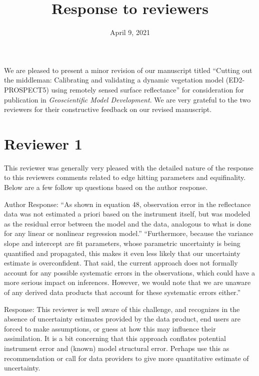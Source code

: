 \documentclass{article}
\title{Response to reviewers}
\author{}
\date{April 9, 2021}
\newenvironment{reviewer}{\par\color{Mahogany}\vspace{6pt}}{\par\vspace{6pt}}
\begin{document}
\maketitle

We are pleased to present a minor revision of our manuscript titled ``Cutting out the middleman: Calibrating and validating a dynamic vegetation model (ED2-PROSPECT5) using remotely sensed surface reflectance'' for consideration for publication in \emph{Geoscientific Model Development}.
We are very grateful to the two reviewers for their constructive feedback on our revised manuscript.

\section{Reviewer 1}\label{sec:r1}

\begin{reviewer}
  This reviewer was generally very pleased with the detailed nature of the response to this reviewers comments related to edge hitting parameters and equifinality. Below are a few follow up questions based on the author response.

  Author Response:
  ``As shown in equation 48, observation error in the reflectance data was not estimated a priori based on the instrument itself, but was modeled as the residual error between the model and the data, analogous to what is done for any linear or nonlinear regression model.''
  ``Furthermore, because the variance slope and intercept are fit parameters, whose parametric uncertainty is being quantified and propagated, this makes it even less likely that our uncertainty estimate is overconfident. That said, the current approach does not formally account for any possible systematic errors in the observations, which could have a more serious impact on inferences. However, we would note that we are unaware of any derived data products that account for these systematic errors either.''

  Response: This reviewer is well aware of this challenge, and recognizes in the absence of uncertainty estimates provided by the data product, end users are forced to make assumptions, or guess at how this may influence their assimilation. It is a bit concerning that this approach conflates potential instrument error and (known) model structural error. Perhaps use this as recommendation or call for data providers to give more quantitative estimate of uncertainty.

\end{reviewer}
\end{document}
